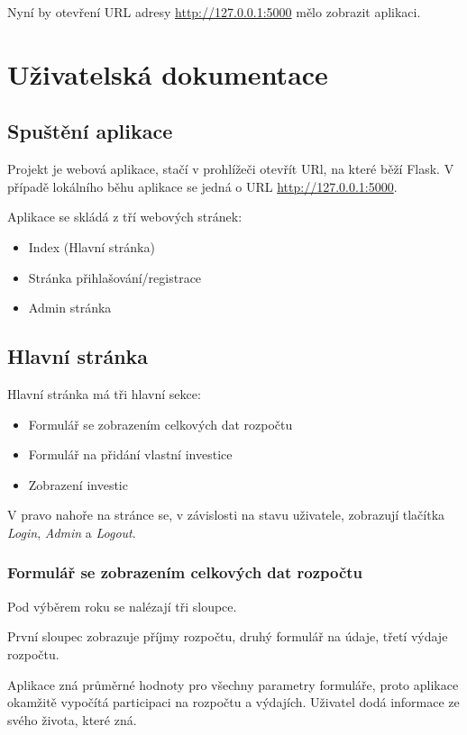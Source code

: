 \documentclass[11pt,a4paper,twoside,openright]{report}
\begin{document}
Nyní by otevření URL adresy \url{http://127.0.0.1:5000} mělo zobrazit aplikaci.

\section{Uživatelská dokumentace}
\subsection{Spuštění aplikace}
Projekt je webová aplikace, stačí v prohlížeči otevřít URl, na které běží Flask.
V případě lokálního běhu aplikace se jedná o URL \url{http://127.0.0.1:5000}.

Aplikace se skládá z tří webových stránek:

\begin{itemize}
  \item Index (Hlavní stránka)
  \item Stránka přihlašování/registrace
  \item Admin stránka
\end{itemize}

\subsection{Hlavní stránka}

Hlavní stránka má tři hlavní sekce:

\begin{itemize}
  \item Formulář se zobrazením celkových dat rozpočtu
  \item Formulář na přidání vlastní investice
  \item Zobrazení investic
\end{itemize}

V pravo nahoře na stránce se, v závislosti na stavu uživatele, zobrazují
tlačítka \emph{Login}, \emph{Admin} a \emph{Logout}.

\subsubsection{Formulář se zobrazením celkových dat rozpočtu}

Pod výběrem roku se nalézají tři sloupce.

První sloupec zobrazuje příjmy rozpočtu, druhý formulář na údaje, třetí
výdaje rozpočtu.

Aplikace zná průměrné hodnoty pro všechny parametry formuláře, proto aplikace
okamžitě vypočítá participaci na rozpočtu a výdajích. Uživatel dodá informace
ze svého života, které zná.
\end{document}
